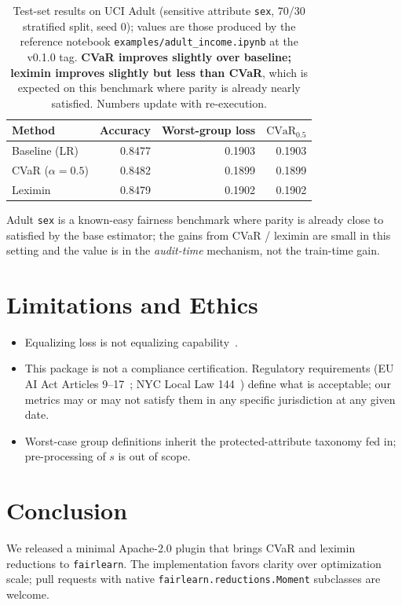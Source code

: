 \documentclass[11pt]{article}
\begin{document}
\begin{table}[h]
\centering
\begin{tabular}{lrrr}
\toprule
Method & Accuracy & Worst-group loss & $\mathrm{CVaR}_{0.5}$ \\
\midrule
Baseline (LR) & 0.8477 & 0.1903 & 0.1903 \\
CVaR ($\alpha=0.5$) & 0.8482 & 0.1899 & 0.1899 \\
Leximin & 0.8479 & 0.1902 & 0.1902 \\
\bottomrule
\end{tabular}
\caption{Test-set results on UCI Adult (sensitive attribute \texttt{sex},
70/30 stratified split, seed 0); values are those produced by the reference
notebook \texttt{examples/adult\_income.ipynb} at the v0.1.0 tag.
\textbf{CVaR improves slightly over baseline; leximin improves slightly
but less than CVaR}, which is expected on this benchmark where parity is
already nearly satisfied. Numbers update with re-execution.}
\end{table}

Adult \texttt{sex} is a known-easy fairness benchmark where parity is
already close to satisfied by the base estimator; the gains from CVaR /
leximin are small in this setting and the value is in the
\emph{audit-time} mechanism, not the train-time gain.

\section{Limitations and Ethics}
\begin{itemize}
\item Equalizing loss is not equalizing capability~\citep{sen1979equality}.
\item This package is not a compliance certification. Regulatory requirements
(EU AI Act Articles 9--17~\citep{euaiact2024}; NYC Local Law 144~\citep{nyc_ll144_2023})
define what is acceptable; our metrics may or may not satisfy them in any
specific jurisdiction at any given date.
\item Worst-case group definitions inherit the protected-attribute taxonomy
fed in; pre-processing of $s$ is out of scope.
\end{itemize}

\section{Conclusion}
We released a minimal Apache-2.0 plugin that brings CVaR and leximin
reductions to \texttt{fairlearn}. The implementation favors clarity over
optimization scale; pull requests with native \texttt{fairlearn.reductions.Moment}
subclasses are welcome.



\end{document}
